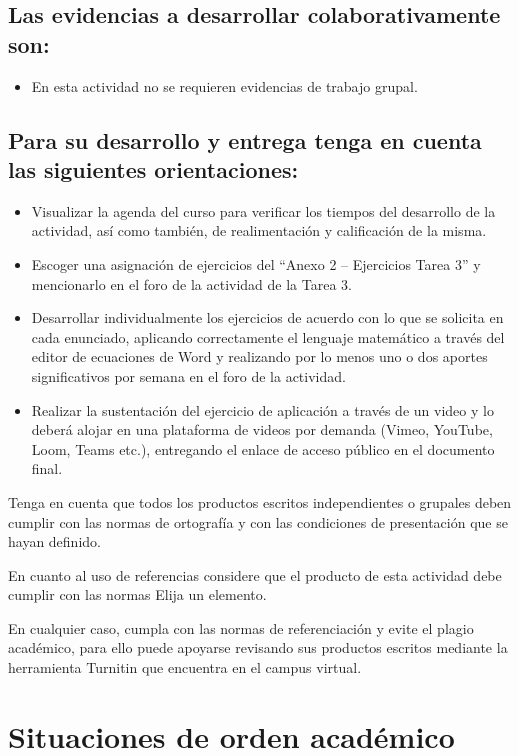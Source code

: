 \documentclass[12pt,letterpaper]{article}
\begin{document}
\subsection*{Las evidencias a desarrollar colaborativamente son:}

\begin{itemize}
\item En esta actividad no se requieren evidencias de trabajo grupal.
\end{itemize}

\subsection*{Para su desarrollo y entrega tenga en cuenta las siguientes orientaciones:}

\begin{itemize}
\item Visualizar la agenda del curso para verificar los tiempos del desarrollo de la actividad, así como también, de realimentación y calificación de la misma.
\item Escoger una asignación de ejercicios del ``Anexo 2 -- Ejercicios Tarea 3'' y mencionarlo en el foro de la actividad de la Tarea 3.
\item Desarrollar individualmente los ejercicios de acuerdo con lo que se solicita en cada enunciado, aplicando correctamente el lenguaje matemático a través del editor de ecuaciones de Word y realizando por lo menos uno o dos aportes significativos por semana en el foro de la actividad.
\item Realizar la sustentación del ejercicio de aplicación a través de un video y lo deberá alojar en una plataforma de videos por demanda (Vimeo, YouTube, Loom, Teams etc.), entregando el enlace de acceso público en el documento final.
\end{itemize}

Tenga en cuenta que todos los productos escritos independientes o grupales deben cumplir con las normas de ortografía y con las condiciones de presentación que se hayan definido.

En cuanto al uso de referencias considere que el producto de esta actividad debe cumplir con las normas Elija un elemento.

En cualquier caso, cumpla con las normas de referenciación y evite el plagio académico, para ello puede apoyarse revisando sus productos escritos mediante la herramienta Turnitin que encuentra en el campus virtual.

\section{Situaciones de orden académico}
\end{document}
